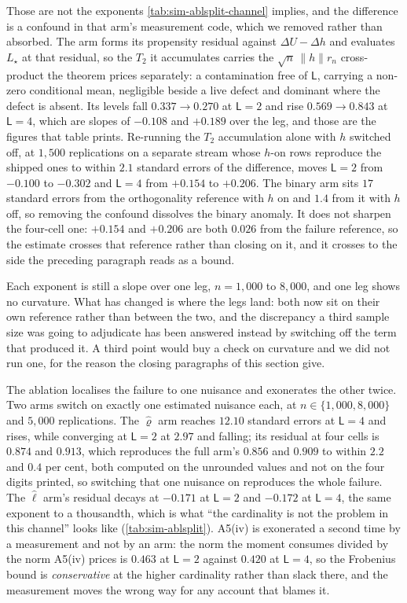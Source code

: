 \documentclass[
  12pt]{article}
\newcommand{\1}[1]{\mathds{1}\left[#1\right]}
\theoremstyle{plain}
\theoremstyle{definition}
\theoremstyle{definition}
\theoremstyle{remark}
\begin{document}
Those are not the exponents \cref{tab:sim-ablsplit-channel} implies, and the
difference is a confound in that arm's measurement code, which we removed rather
than absorbed. The arm forms its propensity residual against $\Delta U-\Delta h$
and evaluates $L_\star$ at that residual, so the $T_2$ it accumulates carries the
$\sqrt n\,\|h\|r_n$ cross-product the theorem prices separately: a contamination
free of $\mathsf L$, carrying a non-zero conditional mean, negligible beside a
live defect and dominant where the defect is absent. Its levels fall
$0.337\to0.270$ at $\mathsf L=2$ and rise $0.569\to0.843$ at $\mathsf L=4$, which
are slopes of $-0.108$ and $+0.189$ over the leg, and those are the figures that
table prints. Re-running the $T_2$ accumulation alone with $h$ switched off, at
$1{,}500$ replications on a separate stream whose $h$-on rows reproduce the
shipped ones to within $2.1$ standard errors of the difference, moves
$\mathsf L=2$ from $-0.100$ to $-0.302$ and $\mathsf L=4$ from $+0.154$ to
$+0.206$. The binary arm sits $17$
standard errors from the orthogonality reference with $h$ on and $1.4$ from it
with $h$ off, so removing the confound dissolves the binary anomaly. It does not
sharpen the four-cell one: $+0.154$ and $+0.206$ are both $0.026$ from the
failure reference, so the estimate crosses that reference rather than closing on
it, and it crosses to the side the preceding paragraph reads as a bound.

Each exponent is still a slope over one leg, $n=1{,}000$ to $8{,}000$, and one
leg shows no curvature. What has changed is where the legs land: both now sit on
their own reference rather than between the two, and the discrepancy a third
sample size was going to adjudicate has been answered instead by switching off
the term that produced it. A third point would buy a check on curvature and we
did not run one, for the reason the closing paragraphs of this section give.

The ablation localises the failure to one nuisance and exonerates the other
twice. Two arms switch on exactly one estimated nuisance each, at
$n\in\{1{,}000,8{,}000\}$ and $5{,}000$ replications. The $\hat\varrho$ arm
reaches $12.10$ standard errors at $\mathsf L=4$ and rises, while converging at
$\mathsf L=2$ at $2.97$ and falling; its residual at four cells is $0.874$ and
$0.913$, which reproduces the full arm's $0.856$ and $0.909$ to within $2.2$ and
$0.4$ per cent, both computed on the unrounded values and not on the four digits
printed, so switching that one nuisance on reproduces the whole failure. The
$\hat\ell$ arm's residual decays at $-0.171$ at $\mathsf L=2$ and $-0.172$ at
$\mathsf L=4$, the same exponent to a thousandth, which is what ``the cardinality
is not the problem in this channel'' looks like (\cref{tab:sim-ablsplit}). A5(iv)
is exonerated a second time by a measurement and not by an arm: the norm the
moment consumes divided by the norm A5(iv) prices is $0.463$ at $\mathsf L=2$
against $0.420$ at $\mathsf L=4$, so the Frobenius bound is \emph{conservative} at the
higher cardinality rather than slack there, and the measurement moves the wrong
way for any account that blames it.
\end{document}
